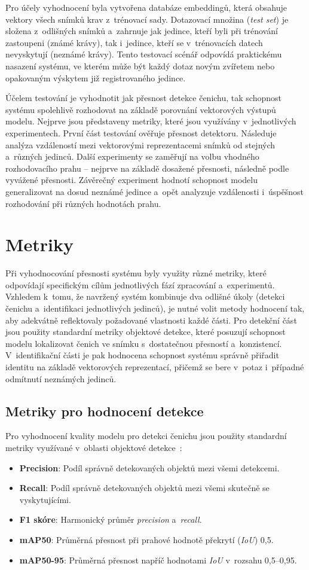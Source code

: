 Pro účely vyhodnocení byla vytvořena databáze embeddingů, která obsahuje vektory všech snímků krav z~trénovací sady. Dotazovací množina (\textit{test set}) je složena z~odlišných snímků a~zahrnuje jak jedince, kteří byli při trénování zastoupeni (známé krávy), tak i~jedince, kteří se v~trénovacích datech nevyskytují (neznámé krávy). Tento testovací scénář odpovídá praktickému nasazení systému, ve kterém může být každý dotaz novým zvířetem nebo opakovaným výskytem již registrovaného jedince.

Účelem testování je vyhodnotit jak přesnost detekce čenichu, tak schopnost systému spolehlivě rozhodovat na základě porovnání vektorových výstupů modelu. Nejprve jsou představeny metriky, které jsou využívány v~jednotlivých experimentech. První část testování ověřuje přesnost detektoru. Následuje analýza vzdáleností mezi vektorovými reprezentacemi snímků od stejných a~různých jedinců. Další experimenty se zaměřují na volbu vhodného rozhodovacího prahu -- nejprve na základě dosažené přesnosti, následně podle vyvážené přesnosti. Závěrečný experiment hodnotí schopnost modelu generalizovat na dosud neznámé jedince a~opět analyzuje vzdálenosti i~úspěšnost rozhodování při různých hodnotách prahu.

\section{Metriky}
\label{metrics}
Při vyhodnocování přesnosti systému byly využity různé metriky, které odpovídají specifickým cílům jednotlivých fází zpracování a~experimentů. Vzhledem k~tomu, že navržený systém kombinuje dva odlišné úkoly (detekci čenichu a~identifikaci jednotlivých jedinců), je nutné volit metody hodnocení tak, aby adekvátně reflektovaly požadované vlastnosti každé části. Pro detekční část jsou použity standardní metriky objektové detekce, které posuzují schopnost modelu lokalizovat čenich ve snímku s~dostatečnou přesností a~konzistencí. V~identifikační části je pak hodnocena schopnost systému správně přiřadit identitu na základě vektorových reprezentací, přičemž se bere v~potaz i~případné odmítnutí neznámých jedinců.

\subsection*{Metriky pro hodnocení detekce}
Pro vyhodnocení kvality modelu pro detekci čenichu jsou použity standardní metriky využívané v~oblasti objektové detekce~\cite{yolo_docs}:
\begin{itemize}
	\item \textbf{Precision}: Podíl správně detekovaných objektů mezi všemi detekcemi.
	\item \textbf{Recall}: Podíl správně detekovaných objektů mezi všemi skutečně se vyskytujícími.
	\item \textbf{F1 skóre}: Harmonický průměr \textit{precision} a~\textit{recall}.
	\item \textbf{mAP50}: Průměrná přesnost při prahové hodnotě překrytí (\textit{IoU}) 0,5.
	\item \textbf{mAP50-95}: Průměrná přesnost napříč hodnotami \textit{IoU} v~rozsahu 0,5--0,95.
\end{itemize}

